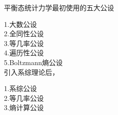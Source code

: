 \documentclass[12pt,a4paper]{article}
\begin{document}
平衡态统计力学最初使用的五大公设

1.大数公设 \\

2.全同性公设 \\

3.等几率公设 \\

4.遍历性公设 \\

5.Boltzmann熵公设 \\

引入系综理论后，

1.系综公设 \\

2.等几率公设 \\

3.熵计算公设 \\
\end{document}
